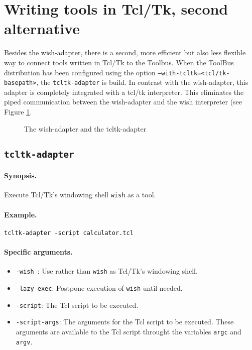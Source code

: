 
\section{\label{ToolsInTcl2}Writing tools in Tcl/Tk, second alternative}

Besides the wish-adapter, there is a second, more efficient but also
less flexible way to connect tools written in Tcl/Tk to the Toolbus.
When the ToolBus distribution has been configured using the option
{\tt --with-tcltk=<tcl/tk-basepath>}, the {\tt tcltk-adapter} is build.
In contrast with the wish-adapter, this adapter is completely integrated 
with a tcl/tk interpreter. This eliminates the piped communication between
the wish-adapter and the wish interpreter (see Figure \ref{tcltk-adapters}.

\begin{figure}[htb]
  \centerline{}
  \caption{\label{tcltk-adapters}The wish-adapter and the tcltk-adapter}
\end{figure}
 

\subsection{\label{tcltk-adapter}{\tt tcltk-adapter}}

\paragraph{Synopsis.} Execute Tcl/Tk's windowing shell {\tt wish} as a tool.

\paragraph{Example.} {\tt tcltk-adapter -script calculator.tcl}

\paragraph{Specific arguments.}
\begin{itemize}
\item {\tt -wish }: Use  rather than {\tt wish} as Tcl/Tk's windowing shell.
\item {\tt -lazy-exec}: Postpone execution of {\tt wish} until needed.
\item {\tt -script}: The Tcl script to be executed.
\item {\tt -script-args}: The arguments for the Tcl script to be executed.
      These arguments are available to the Tcl script throught the variables
      {\tt argc} and {\tt argv}.
\end{itemize}

